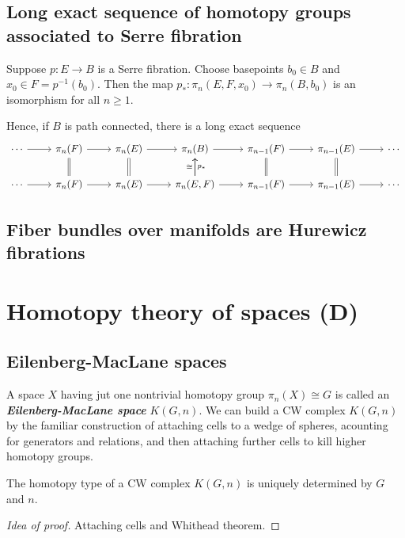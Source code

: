 \subsection{Long exact sequence of homotopy groups associated to Serre fibration}
\begin{thm}[Hatcher 4.41]
	Suppose $p:E\to B$ is a Serre fibration. Choose basepoints $b_{0}\in B$ and $x_{0}\in F=p^{-1}(b_{0})$. Then the map $p_{*}:\pi_{n}(E,F,x_{0})\to \pi_{n}(B,b_{0})$ is an isomorphism for all $n\geq 1$.

	Hence, if $B$ is path connected, there is a long exact sequence
\[\begin{tikzcd}
	\cdots\arrow[r]&\pi_n(F)\arrow[r]&\pi_n(E)\arrow[r]&\pi_n(B)\arrow[r]&\pi_{n-1}(F)\arrow[r]&\pi_{n-1}(E)\arrow[r]&\cdots\\
	\cdots\arrow[r]&\pi_n(F)\arrow[r]\arrow[u,equals]&\pi_n(E)\arrow[r]\arrow[u,equals]&\pi_n(E,F)\arrow[r]\arrow[u,"\cong "]\arrow[u,swap,"p_{*}"]&\pi_{n-1}(F)\arrow[r]\arrow[u,equals]&\pi_{n-1}(E)\arrow[r]\arrow[u,equals]&\cdots
\end{tikzcd}\]
\end{thm}

\subsection*{Fiber bundles over manifolds are Hurewicz fibrations}

\section*{Homotopy theory of spaces (D)}

\subsection{Eilenberg-MacLane spaces}
A space $X$ having jut one nontrivial homotopy group $\pi_{n}(X)\cong G$ is called an \textit{\textbf{Eilenberg-MacLane space}} $K(G,n)$. We can build a CW complex $K(G,n)$ by the familiar construction of attaching cells to a wedge of spheres, acounting for generators and relations, and then attaching further cells to kill higher homotopy groups.

\begin{prop}[4.30]
	The homotopy type of a CW complex $K(G,n)$ is uniquely determined by $G$ and $n$.
\end{prop}
\begin{proof}[Idea of proof]
	Attaching cells and Whithead theorem.
\end{proof}

